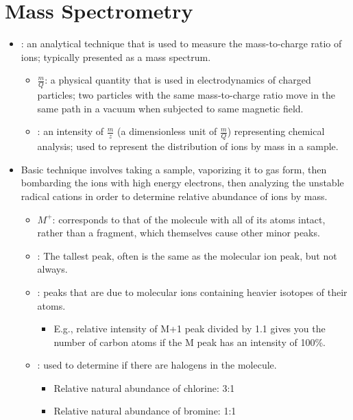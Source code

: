 \section{Mass Spectrometry}\label{Mass Spectrometry}
\begin{itemize}
  \item {}: an analytical technique that is used to measure the mass-to-charge ratio of ions; typically presented as a mass spectrum.
    \begin{itemize}
      \item {} \(\frac{m}{Q}\): a physical quantity that is used in electrodynamics of charged particles; two particles with the same mass-to-charge ratio move in the same path in a vacuum when subjected to same magnetic field.
      \item {}: an intensity of \(\frac{m}{z}\) (a dimensionless unit of \(\frac{m}{Q}\)) representing chemical analysis; used to represent the distribution of ions by mass in a sample.
    \end{itemize}
  \item Basic technique involves taking a sample, vaporizing it to gas form, then bombarding the ions with high energy electrons, then analyzing the unstable radical cations in order to determine relative abundance of ions by mass.
    \begin{itemize}
      \item {} \(M^+\): corresponds to that of the molecule with all of its atoms intact, rather than a fragment, which themselves cause other minor peaks.
      \item {}: The tallest peak, often is the same as the molecular ion peak, but not always.
      \item {}: peaks that are due to molecular ions containing heavier isotopes of their atoms.
        \begin{itemize}
          \item E.g., relative intensity of M+1 peak divided by 1.1 gives you the number of carbon atoms if the M peak has an intensity of 100\%.
        \end{itemize}
      \item {}: used to determine if there are halogens in the molecule.
        \begin{itemize}
          \item Relative natural abundance of chlorine: 3:1
          \item Relative natural abundance of bromine: 1:1

\end{itemize}
\end{itemize}
\end{itemize}
